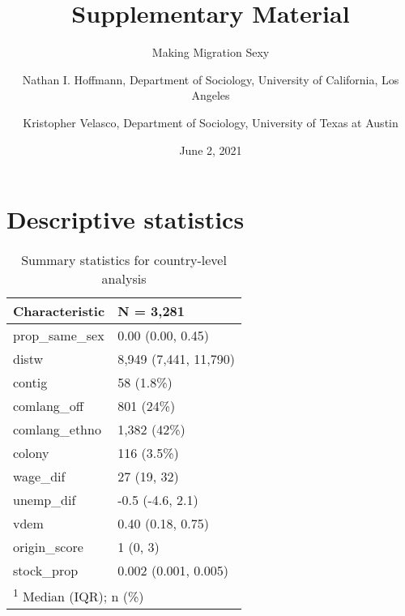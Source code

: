 \documentclass[
  11pt,
]{article}
\title{Supplementary Material}
\subtitle{Making Migration Sexy}
\author{Nathan I. Hoffmann, Department of Sociology, University of California, Los Angeles \and Kristopher Velasco, Department of Sociology, University of Texas at Austin}
\date{June 2, 2021}
\begin{document}
\maketitle

{
\hypersetup{linkcolor=}
\setcounter{tocdepth}{2}
\tableofcontents
}
\hypertarget{descriptive-statistics}{%
\section{Descriptive statistics}\label{descriptive-statistics}}

\begin{table}

\caption{\label{tab:desc-table-country}Summary statistics for country-level analysis}
\centering
\fontsize{8}{10}\selectfont
\begin{tabular}[t]{ll}
\toprule
Characteristic & N = 3,281\\
\midrule
prop\_same\_sex & 0.00 (0.00, 0.45)\\
distw & 8,949 (7,441, 11,790)\\
contig & 58 (1.8\%)\\
comlang\_off & 801 (24\%)\\
comlang\_ethno & 1,382 (42\%)\\
\addlinespace
colony & 116 (3.5\%)\\
wage\_dif & 27 (19, 32)\\
unemp\_dif & -0.5 (-4.6, 2.1)\\
vdem & 0.40 (0.18, 0.75)\\
origin\_score & 1 (0, 3)\\
\addlinespace
stock\_prop & 0.002 (0.001, 0.005)\\
\bottomrule
\multicolumn{2}{l}{\rule{0pt}{1em}\textsuperscript{1} Median (IQR); n (\%)}\\
\end{tabular}
\end{table}
\end{document}
